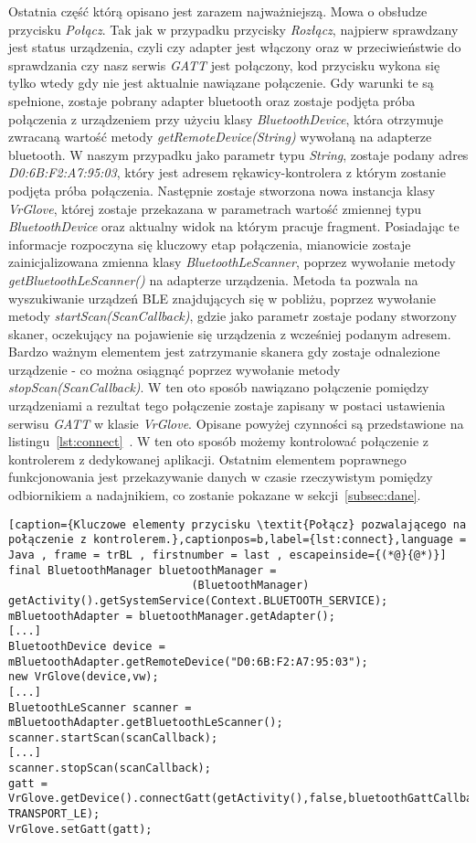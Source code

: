 Ostatnia część którą opisano jest zarazem najważniejszą. Mowa o obsłudze przycisku \textit{Połącz}. Tak jak w przypadku przycisky \textit{Rozłącz}, najpierw sprawdzany jest status urządzenia, czyli czy adapter jest włączony oraz w przeciwieństwie do sprawdzania czy nasz serwis \textit{GATT} jest połączony, kod przycisku wykona się tylko wtedy gdy nie jest aktualnie nawiązane połączenie. Gdy warunki te są spełnione, zostaje pobrany adapter bluetooth oraz zostaje podjęta próba połączenia z urządzeniem przy użyciu klasy \textit{BluetoothDevice}, która otrzymuje zwracaną wartość metody \textit{getRemoteDevice(String)} wywołaną na adapterze bluetooth. W naszym przypadku jako parametr typu \textit{String}, zostaje podany adres \textit{D0:6B:F2:A7:95:03}, który jest adresem rękawicy-kontrolera z którym zostanie podjęta próba połączenia. Następnie zostaje stworzona nowa instancja klasy \textit{VrGlove}, której zostaje przekazana w parametrach wartość zmiennej typu \textit{BluetoothDevice} oraz aktualny widok na którym pracuje fragment. Posiadając te informacje rozpoczyna się kluczowy etap połączenia, mianowicie zostaje zainicjalizowana zmienna klasy \textit{BluetoothLeScanner}, poprzez wywołanie metody \textit{getBluetoothLeScanner()} na adapterze urządzenia. Metoda ta pozwala na wyszukiwanie urządzeń BLE znajdujących się w pobliżu, poprzez wywołanie metody \textit{startScan(ScanCallback)}, gdzie jako parametr zostaje podany stworzony skaner, oczekujący na pojawienie się urządzenia z wcześniej podanym adresem. Bardzo ważnym elementem jest zatrzymanie skanera gdy zostaje odnalezione urządzenie - co można osiągnąć poprzez wywołanie metody \textit{stopScan(ScanCallback)}. W ten oto sposób nawiązano połączenie pomiędzy urządzeniami a rezultat tego połączenie zostaje zapisany w postaci ustawienia serwisu \textit{GATT} w klasie \textit{VrGlove}. Opisane powyżej czynności są przedstawione na listingu~\ref{lst:connect}~\cite{AndroidDoc}. W ten oto sposób możemy kontrolować połączenie z kontrolerem z dedykowanej aplikacji. Ostatnim elementem poprawnego funkcjonowania jest przekazywanie danych w czasie rzeczywistym pomiędzy odbiornikiem a nadajnikiem, co zostanie pokazane w sekcji~\ref{subsec:dane}.
\begin{lstlisting}[caption={Kluczowe elementy przycisku \textit{Połącz} pozwalającego na połączenie z kontrolerem.},captionpos=b,label={lst:connect},language = Java , frame = trBL , firstnumber = last , escapeinside={(*@}{@*)}]
final BluetoothManager bluetoothManager =
                            (BluetoothManager) getActivity().getSystemService(Context.BLUETOOTH_SERVICE);
mBluetoothAdapter = bluetoothManager.getAdapter();
[...]
BluetoothDevice device = mBluetoothAdapter.getRemoteDevice("D0:6B:F2:A7:95:03");
new VrGlove(device,vw);                    
[...]
BluetoothLeScanner scanner = mBluetoothAdapter.getBluetoothLeScanner();
scanner.startScan(scanCallback);
[...]
scanner.stopScan(scanCallback);
gatt = VrGlove.getDevice().connectGatt(getActivity(),false,bluetoothGattCallback, TRANSPORT_LE);
VrGlove.setGatt(gatt);                                                           
\end{lstlisting} 

